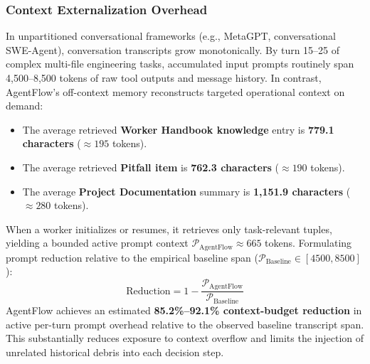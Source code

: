 \documentclass[conference]{IEEEtran}
\begin{document}
\subsubsection{Context Externalization Overhead}
In unpartitioned conversational frameworks (e.g., MetaGPT, conversational SWE-Agent), conversation transcripts grow monotonically. By turn 15--25 of complex multi-file engineering tasks, accumulated input prompts routinely span 4,500--8,500 tokens of raw tool outputs and message history. In contrast, AgentFlow's off-context memory reconstructs targeted operational context on demand:
\begin{itemize}
    \item The average retrieved \textbf{Worker Handbook knowledge} entry is \textbf{779.1 characters} ($\approx 195$ tokens).
    \item The average retrieved \textbf{Pitfall item} is \textbf{762.3 characters} ($\approx 190$ tokens).
    \item The average \textbf{Project Documentation} summary is \textbf{1,151.9 characters} ($\approx 280$ tokens).
\end{itemize}
When a worker initializes or resumes, it retrieves only task-relevant tuples, yielding a bounded active prompt context $\mathcal{P}_{\text{AgentFlow}} \approx 665$ tokens. Formulating prompt reduction relative to the empirical baseline span ($\mathcal{P}_{\text{Baseline}} \in [4500, 8500]$):
\begin{equation}
\text{Reduction} = 1 - \frac{\mathcal{P}_{\text{AgentFlow}}}{\mathcal{P}_{\text{Baseline}}}
\end{equation}
AgentFlow achieves an estimated \textbf{85.2\%--92.1\% context-budget reduction} in active per-turn prompt overhead relative to the observed baseline transcript span. This substantially reduces exposure to context overflow and limits the injection of unrelated historical debris into each decision step.
\end{document}

